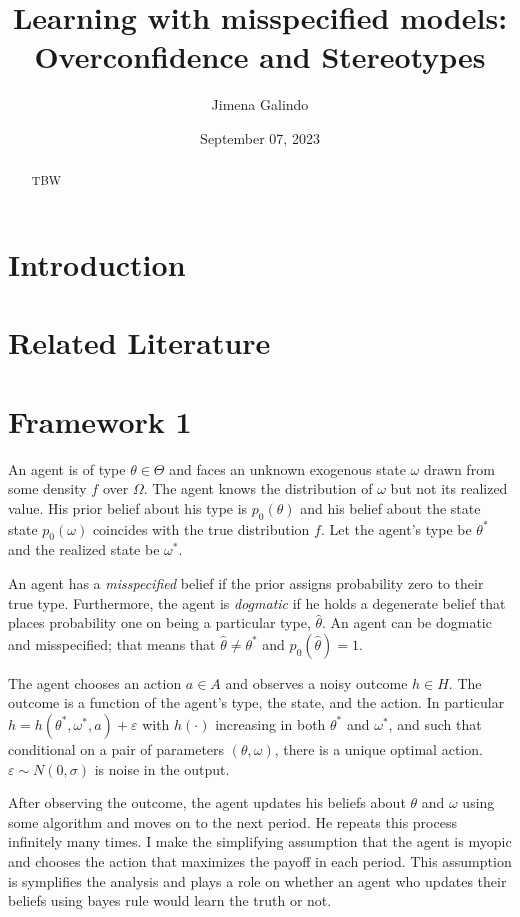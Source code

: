\documentclass[
  12pt,
]{article}
\title{Learning with misspecified models: Overconfidence and
Stereotypes}
\author{Jimena Galindo}
\date{September 07, 2023}
\begin{document}
\maketitle
\begin{abstract}
TBW
\end{abstract}

\hypertarget{introduction}{%
\section{Introduction}\label{introduction}}

\hypertarget{related-literature}{%
\section{Related Literature}\label{related-literature}}

\hypertarget{framework-1}{%
\section{Framework 1}\label{framework-1}}

An agent is of type \(\theta \in \Theta\) and faces an unknown exogenous
state \(\omega\) drawn from some density \(f\) over \(\Omega\). The
agent knows the distribution of \(\omega\) but not its realized value.
His prior belief about his type is \(p_0(\theta)\) and his belief about
the state state \(p_0(\omega)\) coincides with the true distribution
\(f\). Let the agent's type be \(\theta^*\) and the realized state be
\(\omega^*\).

An agent has a \emph{misspecified} belief if the prior assigns
probability zero to their true type. Furthermore, the agent is
\emph{dogmatic} if he holds a degenerate belief that places probability
one on being a particular type, \(\hat{\theta}\). An agent can be
dogmatic and misspecified; that means that
\(\hat{\theta} \neq \theta^*\) and \(p_0(\hat{\theta}) = 1\).

The agent chooses an action \(a\in A\) and observes a noisy outcome
\(h\in H\). The outcome is a function of the agent's type, the state,
and the action. In particular
\(h = h(\theta^*, \omega^*, a) + \varepsilon\) with \(h(\cdot)\)
increasing in both \(\theta^*\) and \(\omega^*\), and such that
conditional on a pair of parameters \((\theta, \omega)\), there is a
unique optimal action. \(\varepsilon\sim N(0, \sigma)\) is noise in the
output.

After observing the outcome, the agent updates his beliefs about
\(\theta\) and \(\omega\) using some algorithm and moves on to the next
period. He repeats this process infinitely many times. I make the
simplifying assumption that the agent is myopic and chooses the action
that maximizes the payoff in each period. This assumption is symplifies
the analysis and plays a role on whether an agent who updates their
beliefs using bayes rule would learn the truth or not.
\end{document}
